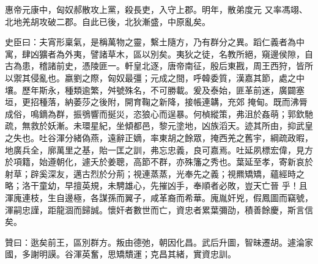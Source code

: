 \begin{pinyinscope}
 惠帝元康中，匈奴郝散攻上黨，殺長吏，入守上郡。明年，散弟度元
 又率馮翊、北地羌胡攻破二郡。自此已後，北狄漸盛，中原亂矣。



 史臣曰：夫宵形稟氣，是稱萬物之靈，繫土隨方，乃有群分之異。蹈仁義者為中寓，肆凶獷者為外夷，譬諸草木，區以別矣。夷狄之徒，名教所絕，窺邊侯隙，自古為患，稽諸前史，憑陵匪一。軒皇北逐，唐帝南征，殷后東戡，周王西狩，皆所以禦其侵亂也。嬴劉之際，匈奴最彊；元成之間，呼韓委質，漢嘉其節，處之中壤。歷年斯永，種類逾繁，舛號殊名，不可勝載。爰及泰始，匪革前迷，廣闢塞垣，更招種落，納萎莎之後附，開育鞠之新降，接帳連韝，充郊
 掩甸。既而沸脣成俗，鳴鏑為群，振鴞響而挻災，恣狼心而逞暴。何楨縱策，弗沮於姦萌；郭欽馳疏，無救於妖漸。未環星紀，坐傾都邑，黎元塗地，凶族滔天。迹其所由，抑武皇之失也。吐谷渾分緒偽燕，遠辭正嫡，率東胡之餘眾，掩西羌之舊宇，綱疏政暇，地廣兵全，廓萬里之基，貽一匡之訓，弗忘忠義，良可嘉焉。吐延夙標宏偉，見方於項籍，始遵朝化，遽夭於姜聰，高節不群，亦殊籓之秀也。葉延至孝，寄新哀於射草；辟奚深友，邁古烈於分荊；視連蒸蒸，光奉先之義；視羆矯矯，蘊經時之略；洛干童幼，早擅英規，未騁雄心，先摧凶手，奉順者必敗，豈天亡晉
 乎！且渾廆連枝，生自邊極，各謀孫而翼子，咸革裔而希華。廆胤奸兇，假鳳圖而竊號，渾嗣忠謹，距龍涸而歸誠。懷奸者數世而亡，資忠者累葉彌劭，積善餘慶，斯言信矣。



 贊曰：逖矣前王，區別群方。叛由德弛，朝因化昌。武后升圖，智昧遷胡。遽淪家國，多謝明謨。谷渾英奮，思矯穨運；克昌其緒，實資忠訓。



\end{pinyinscope}